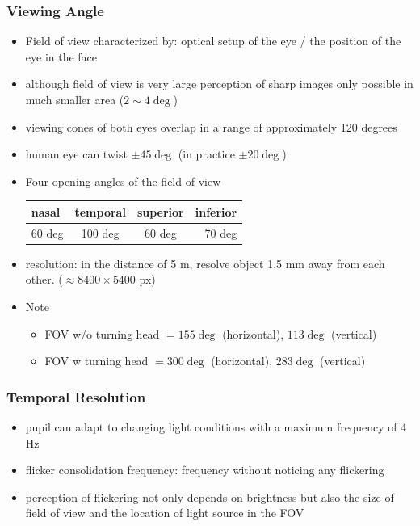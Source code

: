 \documentclass{standalone}
\begin{document}
\subsubsection{Viewing Angle}
\begin{itemize}
	\item Field of view characterized by: optical setup of the eye / the position of the eye in the face
	\item although field of view is very large perception of sharp images only possible in much smaller area ($2 \sim 4\deg$)
	\item viewing cones of both eyes overlap in a range of approximately 120 degrees
	\item human eye can twist $\pm 45 \deg$ (in practice $\pm 20 \deg$)
	\item Four opening angles of the field of view
\begin{table}[H]
\centering
\begin{tabular}{|l|c|c|r|}
\hline
 nasal & temporal & superior & inferior \\ \hline
60 deg & 100 deg & 60 deg & 70 deg \\ \hline
\end{tabular}
\end{table}
	\item resolution: in the distance of 5 m, resolve object 1.5 mm away from each other. ($\approx 8400 \times 5400$ px)
	\item Note 
		\begin{itemize} 
			\item FOV w/o turning head $= 155\deg$ (horizontal), $113\deg$ (vertical) 
			\item FOV w turning head $= 300\deg$ (horizontal), $283\deg$ (vertical) 
		\end{itemize}
\end{itemize}
\subsubsection{Temporal Resolution}
\begin{itemize}
	\item pupil can adapt to changing light conditions with a maximum frequency of 4 Hz	
	\item flicker consolidation frequency: frequency without noticing any flickering
	\item perception of flickering not only depends on brightness but also the size of field of view and the location of light source in the FOV
\end{itemize}
\end{document}
